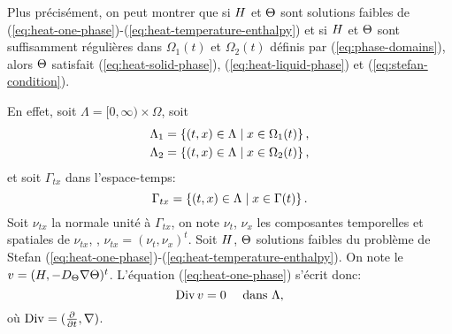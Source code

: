

Plus précisément, on peut montrer que si $H$ et
$\Theta$ sont solutions faibles de
(\ref{eq:heat-one-phase})-(\ref{eq:heat-temperature-enthalpy}) et si
$H$ et $\Theta$ sont suffisamment régulières
dans $\Omega_1(t)$ et $\Omega_2(t)$ définis par
(\ref{eq:phase-domains}), alors $\Theta$ satisfait
(\ref{eq:heat-solid-phase}), (\ref{eq:heat-liquid-phase}) et (\ref{eq:stefan-condition}).


En effet, soit $\Lambda = [0, \infty)\times \Omega$, soit
\begin{align}
  & \Lambda_1 = \left\{ (t, x)\in\Lambda\mid x \in \Omega_1(t) \right\},\\
  & \Lambda_2 = \left\{ (t, x)\in\Lambda\mid x \in \Omega_2(t) \right\},\\
\end{align}
et soit $\Gamma_{tx}$ dans l'espace-temps:
\begin{equation}
  \Gamma_{tx} = \left\{ (t, x) \in \Lambda\mid x \in \Gamma(t) \right\}.
\end{equation}
Soit $\nu_{tx}$ la normale unité à $\Gamma_{tx}$, on note $\nu_t$,
$\nu_x$ les composantes temporelles et spatiales de $\nu_{tx}$, \ie,
$\nu_{tx} = (\nu_t, \nu_x)^t$. Soit $H$, $\Theta$
solutions faibles du problème de Stefan
(\ref{eq:heat-one-phase})-(\ref{eq:heat-temperature-enthalpy}). On
note le $v = (H, -D_\Theta\nabla
\Theta)^t$. L'équation (\ref{eq:heat-one-phase}) s'écrit donc:
\begin{equation}\label{eq:space-time-divergence}
  \operatorname{Div} v = 0 \quad\text{ dans }\Lambda,
\end{equation}
où $\operatorname{Div} = (\frac{\partial}{\partial t}, \nabla)$.



